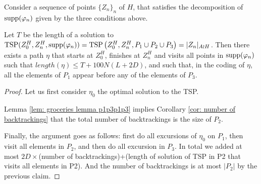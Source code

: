 \begin{lem}
	Consider a sequence of points $\{Z_n\}_n$ of $H$, that satisfies the decomposition of $\mathrm{supp}(\varphi_n)$ given by the three conditions above.
	
	Let $T$ be the length of a solution to $\mathrm{TSP}(Z^H_0,Z^H_n,\mathrm{supp}(\varphi_n))=\mathrm{TSP}\left(Z^H_0,Z^H_n,P_1\cup P_2\cup P_3\right)=|Z_n|_{A \wr H}$. Then there exists a path $\eta$ that starts at $Z^H_0$, finishes at $Z^H_n$ and visits all points in $\mathrm{supp}(\varphi_n)$ such that $length(\eta)\le T+100 N (L+2D)$, and such that, in the coding of $\eta$, all the elements of $P_1$ appear before any of the elements of $P_3$.
	
\end{lem}
\begin{proof}
	
	Let us first consider $\eta_0$ the optimal solution to the TSP. 
	
	
	Lemma \ref{lem: groceries lemma p1p3p1p3} implies Corollary \ref{cor: number of backtrackings} that the total number of backtrackings is the size of $P_2$.
	
	Finally, the argument goes as follows: first do all excursions of $\eta_0$ on $P_1$, then visit all elements in $P_2$, and then do all excursion in $P_3$. In total we added at most $2D\times$(number of backtrackings)+(length of solution of TSP in P2 that visits all elements in P2). And the number of backtrackings is at most $|P_2|$ by the previous claim.
	
\end{proof}
